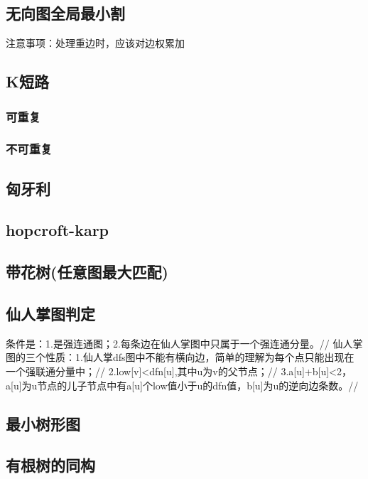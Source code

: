 \documentclass[landscape,a4paper]{article}
\begin{document}
\begin{spacing}{0.3}
\begin{multicols}{2}
	\subsection{无向图全局最小割}
	注意事项：处理重边时，应该对边权累加
	

		
		\subsection{K短路}
	\subsubsection{可重复}
	
	\subsubsection{不可重复}
	
	\subsection{匈牙利}
	
	\subsection{hopcroft-karp}
	
	\subsection{带花树(任意图最大匹配)}
	
	\subsection{仙人掌图判定}
	条件是：1.是强连通图；2.每条边在仙人掌图中只属于一个强连通分量。//
	仙人掌图的三个性质：1.仙人掌dfs图中不能有横向边，简单的理解为每个点只能出现在一个强联通分量中；//
	2.low[v]<dfn[u],其中u为v的父节点；//
	3.a[u]+b[u]<2，a[u]为u节点的儿子节点中有a[u]个low值小于u的dfn值，b[u]为u的逆向边条数。//
	

\subsection{最小树形图}
	
	\subsection{有根树的同构}
	

\end{multicols}
\end{spacing}
\end{document}
